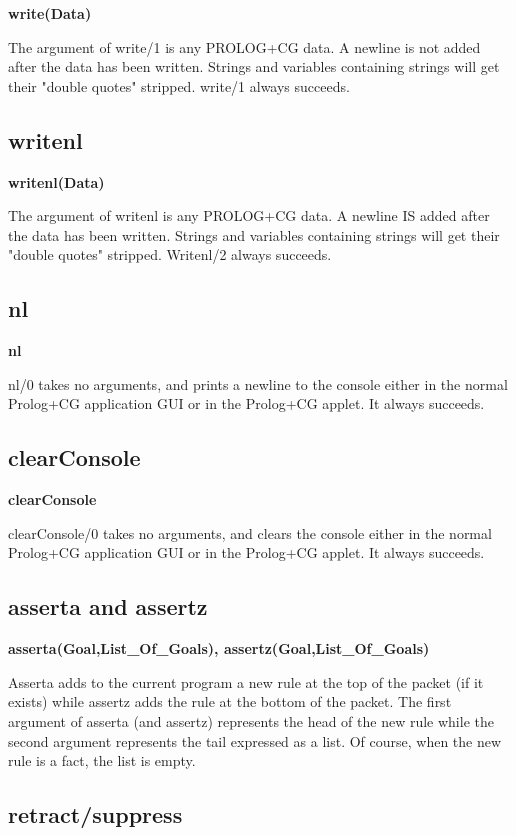 \documentclass{book}
\begin{document}
{\bf write(Data)}

The argument of write/1 is any PROLOG+CG data. A newline is not
added after the data has been written.  Strings and variables
containing strings will get their "double quotes" stripped.  write/1
always succeeds.


\subsection{writenl}

{\bf writenl(Data)}

The argument of writenl is any PROLOG+CG data. A newline IS added
after the data has been written.  Strings and variables containing
strings will get their "double quotes" stripped.  Writenl/2 always
succeeds.


\subsection{nl}
{\bf nl}

nl/0 takes no arguments, and prints a newline to the console either in
the normal Prolog+CG application GUI or in the Prolog+CG applet.  It
always succeeds.


\subsection{clearConsole}

{\bf clearConsole}

clearConsole/0 takes no arguments, and clears the console either in
the normal Prolog+CG application GUI or in the Prolog+CG applet.  It
always succeeds.


\subsection{asserta and assertz}

{\bf asserta(Goal,List\_Of\_Goals), assertz(Goal,List\_Of\_Goals)}

Asserta adds to the current program a new rule at the top of the
packet (if it exists) while assertz adds the rule at the bottom of the
packet. The first argument of asserta (and assertz) represents the
head of the new rule while the second argument represents the tail
expressed as a list. Of course, when the new rule is a fact, the list
is empty.

\subsection{retract/suppress}
\end{document}
